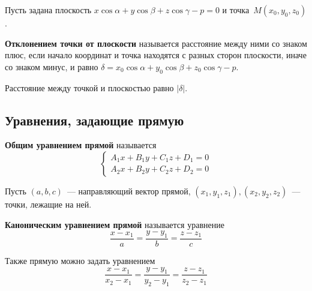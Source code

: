 Пусть задана плоскость $x \cos \alpha + y \cos \beta + z \cos \gamma - p = 0$ и точка~$M(x_0, y_0, z_0)$.

 \textbf{Отклонением точки от плоскости} называется расстояние между ними со знаком плюс, если начало координат и точка находятся с разных сторон плоскости, иначе со знаком минус, и равно $\delta = x_0 \cos \alpha + y_0 \cos \beta + z_0 \cos \gamma - p$.

Расстояние между точкой и плоскостью равно $|\delta|$.

\subsection{Уравнения, задающие прямую}
 \textbf{Общим уравнением прямой} называется
\begin{equation*}
\begin{cases}
A_1 x + B_1 y + C_1 z + D_1 = 0 \\
A_2 x + B_2 y + C_2 z + D_2 = 0
\end{cases}
\end{equation*}

Пусть $(a, b, c)$~--- направляющий вектор прямой, $(x_1, y_1, z_1), (x_2, y_2, z_2)$~--- точки, лежащие на ней.

\textbf{Каноническим уравнением прямой} называется уравнение
\begin{equation*}
\frac{x - x_1}a = \frac{y - y_1}b = \frac{z - z_1}c
\end{equation*}

Также прямую можно задать уравнением
\begin{equation*}
\frac{x - x_1}{x_2 - x_1} = \frac{y - y_1}{y_2 - y_1} = \frac{z - z_1}{z_2 - z_1}
\end{equation*}